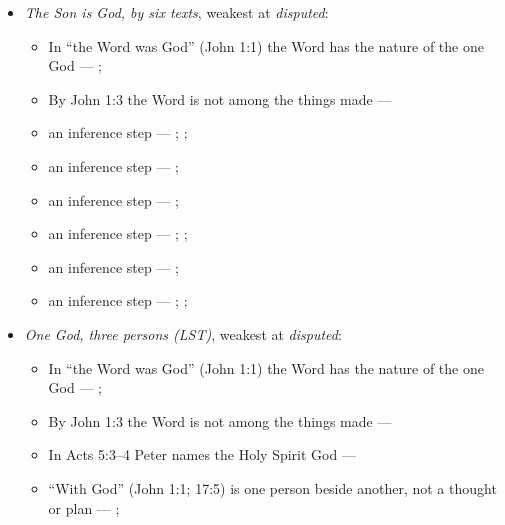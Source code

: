 \documentclass[11pt,paper=\testimonypaper,DIV=13,parskip=false]{scrartcl}
\begin{document}
\begin{itemize}
\begin{itemize}
\end{itemize}
\item \emph{The Son is God, by six texts}, weakest at \emph{disputed}:
\begin{itemize}
\item In “the Word was God” (John 1:1) the Word has the nature of the one God --- \cite{harner-qualitative-anarthrous-1973}; \cite[3, The Triune God]{kibbey-living-systematic-theology-2026}
\item By John 1:3 the Word is not among the things made --- \cite[Tractates on John I.11]{schaff-nicene-post-nicene-fathers-1-7}
\item an inference step --- \cite[3, The Triune God]{kibbey-living-systematic-theology-2026}; \cite[ch. 4, Conclusion]{bernard-oneness-of-god-1983}; \cite[17--19]{buzzard-caveat-lector-2001}
\item an inference step --- \cite[Tractates on John 121.5]{schaff-nicene-post-nicene-fathers-1-7}; \cite[71]{metzger-jehovahs-witnesses-jesus-christ-1953}
\item an inference step --- \cite[on Hebrews 1:8]{calvin-hebrews-1853}; \cite{new-world-translation-2013}
\item an inference step --- \cite[23--24]{sharp-remarks-definitive-article-1803}; \cite[79]{metzger-jehovahs-witnesses-jesus-christ-1953}; \cite{new-world-translation-2013}
\item an inference step --- \cite[on Romans 9:5]{calvin-romans-1849}; \cite{new-world-translation-2013}
\item an inference step --- \cite[on Philippians 2:9–10]{calvin-commentaries-philippians}; \cite[on Romans 14:11]{calvin-romans-1849}; \cite{new-world-translation-2013}
\end{itemize}
\item \emph{One God, three persons (LST)}, weakest at \emph{disputed}:
\begin{itemize}
\item In “the Word was God” (John 1:1) the Word has the nature of the one God --- \cite{harner-qualitative-anarthrous-1973}; \cite[3, The Triune God]{kibbey-living-systematic-theology-2026}
\item By John 1:3 the Word is not among the things made --- \cite[Tractates on John I.11]{schaff-nicene-post-nicene-fathers-1-7}
\item In Acts 5:3–4 Peter names the Holy Spirit God --- \cite[198]{calvin-commentary-acts-1844}
\item “With God” (John 1:1; 17:5) is one person beside another, not a thought or plan --- \cite[3, The Triune God]{kibbey-living-systematic-theology-2026}; \cite[27]{watchtower-should-you-believe-trinity-1989}

\end{itemize}
\end{itemize}
\end{document}
